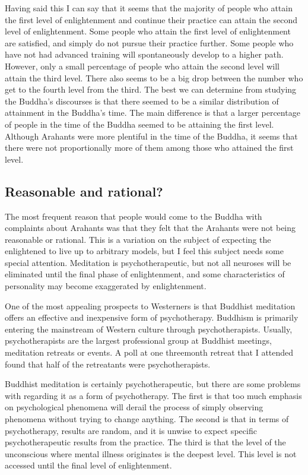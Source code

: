 \documentclass[a5paper,10pt,english]{book}
\begin{document}
\sphinxAtStartPar
Having said this I can say that it seems that the majority of people who
attain the first level of enlightenment and continue their practice can
attain the second level of enlightenment. Some people who attain the
first level of enlightenment are satisfied, and simply do not pursue
their practice further. Some people who have not had advanced training
will spontaneously develop  to a higher path.
However, only a small percentage of people who attain the second level
will attain the third level. There also seems to be a big drop between
the number who get to the fourth level from the third. The best we can
determine from studying the Buddha’s discourses is that there seemed to
be a similar distribution of attainment in the Buddha’s time. The main
difference is that a larger percentage of people in the time of the
Buddha seemed to be attaining the first level. Although Arahants were
more plentiful in the time of the Buddha, it seems that there were not
proportionally more of them among those who attained the first level.


\subsection{Reasonable and rational?}
\label{\detokenize{saints:reasonable-and-rational}}
\sphinxAtStartPar
The most frequent reason that people would come to the Buddha with
complaints about Arahants was that they felt that the Arahants were not
being reasonable or rational. This is a variation on the subject of
expecting the enlightened to live up to arbitrary models, but I feel
this subject needs some special attention. Meditation is
psychotherapeutic, but not all neuroses will be eliminated until the
final phase of enlightenment, and some characteristics of personality
may become exaggerated by enlightenment.

\sphinxAtStartPar
One of the most appealing prospects to Westerners is that Buddhist
meditation offers an effective and inexpensive form of psychotherapy.
Buddhism is primarily entering the mainstream of Western culture through
psychotherapists. Usually, psychotherapists are the largest professional
group at Buddhist meetings, meditation retreats or events. A poll at one
three\sphinxhyphen{}month retreat that I attended found that half of the retreatants
were psychotherapists.

\sphinxAtStartPar
Buddhist meditation is certainly psychotherapeutic, but there are some
problems with regarding it as a form of psychotherapy. The first is that
too much emphasis on psychological phenomena will derail the process of
simply observing phenomena without trying to change anything. The second
is that in terms of psychotherapy, results are random, and it is unwise
to expect specific psychotherapeutic results from the practice. The
third is that the level of the unconscious where mental illness
originates is the deepest level. This level is not accessed until the
final level of enlightenment.
\end{document}
